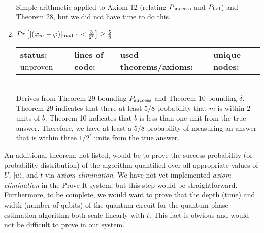 \documentclass{article}[12pt]
\begin{document}
\begin{enumerate}
\begin{tabular}{l | l | l | l}
  \end{tabular} \hfill \\
  Simple arithmetic applied to Axiom 12 (relating $P_{\rm success}$ and $P_{\rm fail}$) and Theorem 28, but we did not have time to do this.
\item $Pr\left[\vert (\varphi_m - \varphi) \vert_{{\rm mod}~1} < \frac{3}{2^t}\right] \geq \frac{5}{8}$ \hfill \\
  \begin{tabular}{l | l | l | l}
    \textbf{status:} unproven & \textbf{lines of code:} - & \textbf{used theorems/axioms:} - & \textbf{unique nodes:} -            
  \end{tabular} \hfill \\
  Derives from Theorem 29 bounding $P_{\rm success}$ and Theorem 10 bounding $\delta$.  Theorem 29 indicates that there at least $5/8$ probability that $m$ is within $2$ units of $b$.  Theorem 10 indicates that $b$ is less than one unit from the true answer.  Therefore, we have at least a $5/8$ probability of measuring an answer that is within three $1/2^t$ units from the true answer.
\end{enumerate}
An additional theorem, not listed, would be to prove the success probability (or probability distribution) of the algorithm quantified over all appropriate values of $U$, $\lvert u \rangle$, and $t$ via {\em axiom elimination}.  We have not yet implemented {\em axiom elimination} in the Prove-It system, but this step would be straightforward.  Furthermore, to be complete, we would want to prove that the depth (time) and width (number of qubits) of the quantum circuit for the quantum phase estimation algorithm both scale linearly with $t$.  This fact is obvious and would not be difficult to prove in our system.
\end{document}
